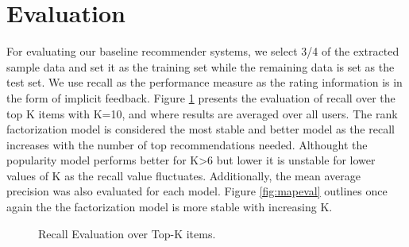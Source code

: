 \documentclass{article} %
\begin{document}
\section{Evaluation}

For evaluating our baseline recommender systems, we select 3/4 of the extracted sample data and set it as the training set while the remaining data is set as the test set. We use recall as the performance measure as the rating information is in the form of implicit feedback. Figure  \ref{fig:recalleval} presents the evaluation of recall over the top K items with K=10, and where results are averaged over all users. The rank factorization model is considered the most stable and better model as the recall increases with the number of top recommendations needed. Althought the popularity model performs better for K\textgreater6 but lower it is unstable for lower values of K as the recall value fluctuates. Additionally, the mean average precision was also evaluated for each model. Figure \ref{fig:mapeval} outlines once again the the factorization model is more stable with increasing K.

\begin{figure}[!hbtp]
\begin{center}
\end{center}
\caption{Recall Evaluation over Top-K items.}
\label{fig:recalleval}
\end{figure}
\end{document}
